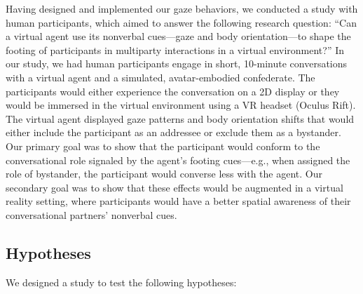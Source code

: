 Having designed and implemented our gaze behaviors, we conducted a study with human participants, which aimed to answer the following research question: ``Can a virtual agent use its nonverbal cues---gaze and body orientation---to shape the footing of participants in multiparty interactions in a virtual environment?'' In our study, we had human participants engage in short, 10-minute conversations with a virtual agent and a simulated, avatar-embodied confederate. The participants would either experience the conversation on a 2D display or they would be immersed in the virtual environment using a VR headset (Oculus Rift). The virtual agent displayed gaze patterns and body orientation shifts that would either include the participant as an addressee or exclude them as a bystander. Our primary goal was to show that the participant would conform to the conversational role signaled by the agent's footing cues---e.g., when assigned the role of bystander, the participant would converse less with the agent. Our secondary goal was to show that these effects would be augmented in a virtual reality setting, where participants would have a better spatial awareness of their conversational partners' nonverbal cues.

\subsection{Hypotheses}

We designed a study to test the following hypotheses:

